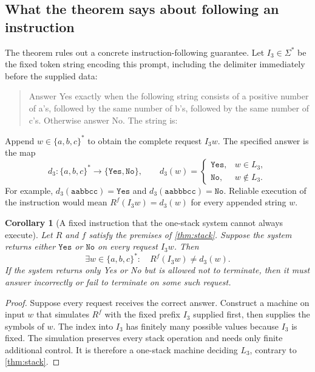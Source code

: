 \documentclass[11pt,twoside]{article}
\newtheorem{corollary}[theorem]{Corollary}
\theoremstyle{definition}
\theoremstyle{remark}
\begin{document}
\subsection{What the theorem says about following an instruction}

The theorem rules out a concrete instruction-following guarantee. Let
$I_3\in\Sigma^*$ be the fixed token string encoding this prompt, including
the delimiter immediately before the supplied data:
\begin{quote}
Answer Yes exactly when the following string consists of a positive number
of a's, followed by the same number of b's, followed by the same number of
c's. Otherwise answer No. The string is:
\end{quote}
Append $w\in\{a,b,c\}^*$ to obtain the complete request $I_3w$. The
specified answer is the map
\begin{equation}
 d_3:\{a,b,c\}^*\to\{\mathtt{Yes},\mathtt{No}\},\qquad
 d_3(w)=\begin{cases}\mathtt{Yes},&w\in L_3,\\
                         \mathtt{No},&w\notin L_3.
          \end{cases}
 \label{eq:three-block-instruction}
\end{equation}
For example, $d_3(\mathtt{aabbcc})=\mathtt{Yes}$ and
$d_3(\mathtt{aabbbcc})=\mathtt{No}$. Reliable execution of the instruction
would mean $R^f(I_3w)=d_3(w)$ for every appended string $w$.

\begin{corollary}[A fixed instruction that the one-stack system cannot always execute]
\label{cor:stack-instruction}
Let $R$ and $f$ satisfy the premises of \cref{thm:stack}. Suppose the system
returns either $\mathtt{Yes}$ or $\mathtt{No}$ on every request $I_3w$.
Then
\begin{equation}
 \exists w\in\{a,b,c\}^*:\quad R^f(I_3w)\ne d_3(w).
 \label{eq:stack-instruction-failure}
\end{equation}
If the system returns only Yes or No but is allowed not to terminate,
then it must answer incorrectly or fail to terminate on some such request.
\end{corollary}
\begin{proof}
Suppose every request receives the correct answer. Construct a machine on
input $w$ that simulates $R^f$ with the fixed prefix $I_3$ supplied first,
then supplies the symbols of $w$. The index into $I_3$ has finitely many
possible values because $I_3$ is fixed. The simulation preserves every
stack operation and needs only finite additional control. It is therefore
a one-stack machine deciding $L_3$, contrary to \cref{thm:stack}.
\end{proof}
\end{document}
